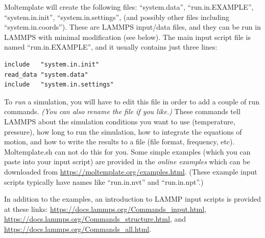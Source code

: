 \documentclass[11pt]{article}
\begin{document}
Moltemplate will create the following files: 
``system.data'',
``run.in.EXAMPLE'',
``system.in.init'',
``system.in.settings'',
(and possibly other files including ``system.in.coords''). 
These are LAMMPS input/data files, and they can be run in LAMMPS 
with minimal modification (see below).
The main input script file is named ``run.in.EXAMPLE'', and it usually contains
just three lines:
\begin{verbatim}
include   "system.in.init"
read_data "system.data"
include   "system.in.settings"
\end{verbatim}

To \textit{run} a simulation, you will have to 
edit this file in order to add a couple of run commands.  
\textit{(You can also rename the file if you like.)}
These commands tell LAMMPS about the simulation conditions
you want to use (temperature, pressure), 
how long to run the simulation,
how to integrate the equations of motion,
and how to write the results to a file (file format, frequency, etc).
Moltemplate.sh can not do this for you.
Some simple examples (which you can paste into your input script)
are provided in the 
\textit{online examples} 
which can be downloaded from \url{https://moltemplate.org/examples.html}.
(These example input scripts 
 typically have names like ``run.in.nvt'' and ``run.in.npt''.)

   In addition to the examples, an introduction to LAMMP 
input scripts is provided at these links:
\url{https://docs.lammps.org/Commands_input.html},
\url{https://docs.lammps.org/Commands_structure.html}, and
\url{https://docs.lammps.org/Commands_all.html}.
\end{document}
